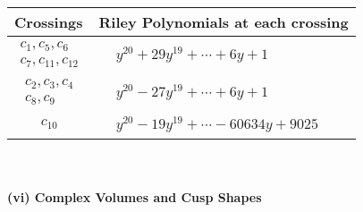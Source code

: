 \documentclass[1p]{elsarticle_modified}
\theoremstyle{definition}
\begin{document}
\begin{tabular}{m{50pt}|m{274pt}}
Crossings & \hspace{64pt}Riley Polynomials at each crossing \\
\hline $$\begin{aligned}c_{1},c_{5},c_{6}\\c_{7},c_{11},c_{12}\end{aligned}$$&$\begin{aligned}
&y^{20}+29 y^{19}+\cdots+6 y+1
\end{aligned}$\\
\hline $$\begin{aligned}c_{2},c_{3},c_{4}\\c_{8},c_{9}\end{aligned}$$&$\begin{aligned}
&y^{20}-27 y^{19}+\cdots+6 y+1
\end{aligned}$\\
\hline $$\begin{aligned}c_{10}\end{aligned}$$&$\begin{aligned}
&y^{20}-19 y^{19}+\cdots-60634 y+9025
\end{aligned}$\\
\hline
\end{tabular}\\~\\
\newpage\flushleft \textbf{(vi) Complex Volumes and Cusp Shapes}
\end{document}
